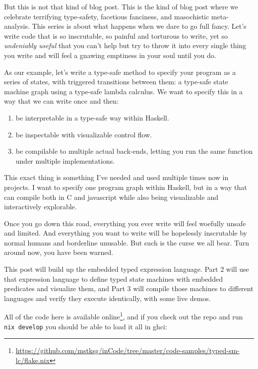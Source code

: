 \documentclass[]{article}
\newenvironment{Shaded}{}{}
\newcommand{\ExtensionTok}[1]{#1}
\newcommand{\NormalTok}[1]{#1}
\newcommand{\OperatorTok}[1]{\textcolor[rgb]{0.40,0.40,0.40}{#1}}
\renewcommand{\href}[2]{#2\footnote{\url{#1}}}
\begin{document}
But this is not that kind of blog post. This is the kind of blog post where we
celebrate terrifying type-safety, facetious fanciness, and masochistic
meta-analysis. This series is about what happens when we dare to go full fancy.
Let's write code that is so inscrutable, so painful and torturous to write, yet
so \emph{undeniably useful} that you can't help but try to throw it into every
single thing you write and will feel a gnawing emptiness in your soul until you
do.

As our example, let's write a type-safe method to specify your program as a
series of states, with triggered transitions between them: a type-safe state
machine graph using a type-safe lambda calculus. We want to specify this in a
way that we can write once and then:

\begin{enumerate}
\def\labelenumi{\arabic{enumi}.}
\tightlist
\item
  be interpretable in a type-safe way within Haskell.
\item
  be inspectable with visualizable control flow.
\item
  be compilable to multiple actual back-ends, letting you run the same function
  under multiple implementations.
\end{enumerate}

This exact thing is something I've needed and used multiple times now in
projects. I want to specify one program graph within Haskell, but in a way that
can compile both in C and javascript while also being visualizable and
interactively explorable.

Once you go down this road, everything you ever write will feel woefully unsafe
and limited. And everything you want to write will be hopelessly inscrutable by
normal humans and borderline unusable. But such is the curse we all bear. Turn
around now, you have been warned.

This post will build up the embedded typed expression language. Part 2 will use
that expression language to define typed state machines with embedded predicates
and visualize them, and Part 3 will compile those machines to different
languages and verify they execute identically, with some live demos.

All of the code here is
\href{https://github.com/mstksg/inCode/tree/master/code-samples/typed-sm-lc/flake.nix}{available
online}, and if you check out the repo and run \texttt{nix\ develop} you should
be able to load it all in ghci:

\begin{Shaded}
\end{Shaded}
\end{document}
